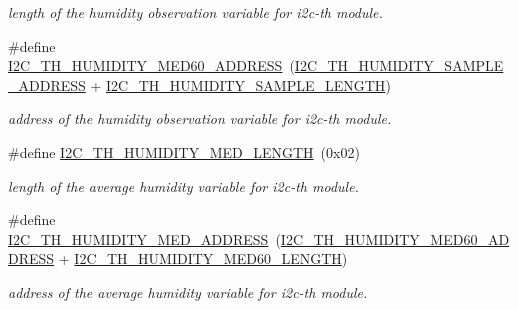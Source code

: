 \begin{DoxyCompactItemize}
\begin{DoxyCompactList}\small\item\em length of the humidity observation variable for i2c-\/th module. \end{DoxyCompactList}\item 
\mbox{\label{registers-th_8h_a394425b89ec96065d52723ec5d9688e0}} 
\#define \hyperlink{registers-th_8h_a394425b89ec96065d52723ec5d9688e0}{I2\+C\+\_\+\+T\+H\+\_\+\+H\+U\+M\+I\+D\+I\+T\+Y\+\_\+\+M\+E\+D60\+\_\+\+A\+D\+D\+R\+E\+SS}~(\hyperlink{registers-th_8h_a82d3a5a7a97efcf0b2aa503c0c6de2a5}{I2\+C\+\_\+\+T\+H\+\_\+\+H\+U\+M\+I\+D\+I\+T\+Y\+\_\+\+S\+A\+M\+P\+L\+E\+\_\+\+A\+D\+D\+R\+E\+SS} + \hyperlink{registers-th_8h_a65dca74d31862278a1846c21d23c844d}{I2\+C\+\_\+\+T\+H\+\_\+\+H\+U\+M\+I\+D\+I\+T\+Y\+\_\+\+S\+A\+M\+P\+L\+E\+\_\+\+L\+E\+N\+G\+TH})
\begin{DoxyCompactList}\small\item\em address of the humidity observation variable for i2c-\/th module. \end{DoxyCompactList}\item 
\mbox{\label{registers-th_8h_ab8c23d04d8c4c952919ca1c4e414dab6}} 
\#define \hyperlink{registers-th_8h_ab8c23d04d8c4c952919ca1c4e414dab6}{I2\+C\+\_\+\+T\+H\+\_\+\+H\+U\+M\+I\+D\+I\+T\+Y\+\_\+\+M\+E\+D\+\_\+\+L\+E\+N\+G\+TH}~(0x02)
\begin{DoxyCompactList}\small\item\em length of the average humidity variable for i2c-\/th module. \end{DoxyCompactList}\item 
\mbox{\label{registers-th_8h_a892db1b7b4d94ccdc702a0ef24df6086}} 
\#define \hyperlink{registers-th_8h_a892db1b7b4d94ccdc702a0ef24df6086}{I2\+C\+\_\+\+T\+H\+\_\+\+H\+U\+M\+I\+D\+I\+T\+Y\+\_\+\+M\+E\+D\+\_\+\+A\+D\+D\+R\+E\+SS}~(\hyperlink{registers-th_8h_a394425b89ec96065d52723ec5d9688e0}{I2\+C\+\_\+\+T\+H\+\_\+\+H\+U\+M\+I\+D\+I\+T\+Y\+\_\+\+M\+E\+D60\+\_\+\+A\+D\+D\+R\+E\+SS} + \hyperlink{registers-th_8h_a0a468dccdfa6ca2993e960b85661efa5}{I2\+C\+\_\+\+T\+H\+\_\+\+H\+U\+M\+I\+D\+I\+T\+Y\+\_\+\+M\+E\+D60\+\_\+\+L\+E\+N\+G\+TH})
\begin{DoxyCompactList}\small\item\em address of the average humidity variable for i2c-\/th module. \end{DoxyCompactList}\item 

\end{DoxyCompactItemize}
